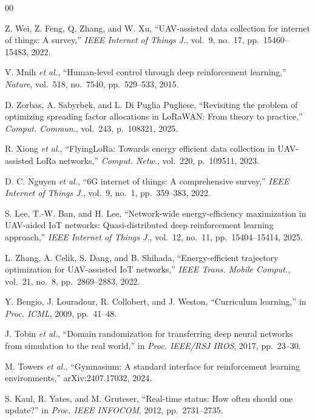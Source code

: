 \documentclass[conference]{IEEEtran}
\begin{document}
\begin{thebibliography}{00}

Z. Wei, Z. Feng, Q. Zhang, and W. Xu,
``{UAV}-assisted data collection for internet of things: A survey,''
\textit{IEEE Internet of Things J.}, vol.~9, no.~17, pp.~15460--15483, 2022.

V. Mnih \textit{et al.},
``Human-level control through deep reinforcement learning,''
\textit{Nature}, vol.~518, no.~7540, pp.~529--533, 2015.

D. Zorbas, A. Sabyrbek, and L. Di Puglia Pugliese,
``Revisiting the problem of optimizing spreading factor allocations
in {LoRaWAN}: From theory to practice,''
\textit{Comput. Commun.}, vol.~243, p.~108321, 2025.

R. Xiong \textit{et al.},
``{FlyingLoRa}: Towards energy efficient data collection
in {UAV}-assisted {LoRa} networks,''
\textit{Comput. Netw.}, vol.~220, p.~109511, 2023.

D. C. Nguyen \textit{et al.},
``{6G} internet of things: A comprehensive survey,''
\textit{IEEE Internet of Things J.}, vol.~9, no.~1, pp.~359--383, 2022.

S. Lee, T.-W. Ban, and H. Lee,
``Network-wide energy-efficiency maximization in {UAV}-aided {IoT} networks:
Quasi-distributed deep reinforcement learning approach,''
\textit{IEEE Internet of Things J.}, vol.~12, no.~11,
pp.~15404--15414, 2025.

L. Zhang, A. Celik, S. Dang, and B. Shihada,
``Energy-efficient trajectory optimization for {UAV}-assisted {IoT} networks,''
\textit{IEEE Trans. Mobile Comput.}, vol.~21, no.~8,
pp.~2869--2883, 2022.

Y. Bengio, J. Louradour, R. Collobert, and J. Weston,
``Curriculum learning,''
in \textit{Proc. ICML}, 2009, pp.~41--48.

J. Tobin \textit{et al.},
``Domain randomization for transferring deep neural networks from simulation
to the real world,''
in \textit{Proc. IEEE/RSJ IROS}, 2017, pp.~23--30.

M. Towers \textit{et al.},
``Gymnasium: A standard interface for reinforcement learning environments,''
arXiv:2407.17032, 2024.

S. Kaul, R. Yates, and M. Gruteser,
``Real-time status: How often should one update?''
in \textit{Proc. IEEE INFOCOM}, 2012, pp.~2731--2735.


\end{thebibliography}
\end{document}

